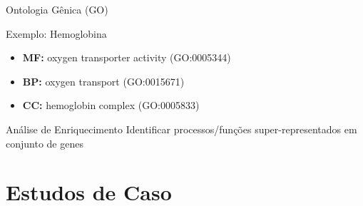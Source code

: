 \begin{frame}[shrink=10]{Ontologia Gênica (GO)}

\vspace{0.3cm}

\begin{exampleblock}{Exemplo: Hemoglobina}
\begin{itemize}
    \item \textbf{MF:} oxygen transporter activity (GO:0005344)
    \item \textbf{BP:} oxygen transport (GO:0015671)
    \item \textbf{CC:} hemoglobin complex (GO:0005833)
\end{itemize}
\end{exampleblock}

\vspace{0.3cm}

\begin{alertblock}{Análise de Enriquecimento}
Identificar processos/funções super-representados em conjunto de genes
\end{alertblock}
\end{frame}

\section{Estudos de Caso}

